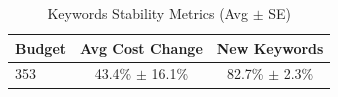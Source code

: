 \begin{table}[htbp]
\centering
\caption{Keywords Stability Metrics (Avg $\pm$ SE)}
\begin{tabular}{lcc}
\toprule
Budget & Avg Cost Change & New Keywords \\
\midrule
353 & 43.4\% $\pm$ 16.1\% & 82.7\% $\pm$ 2.3\% \\
\bottomrule
\end{tabular}
\end{table}